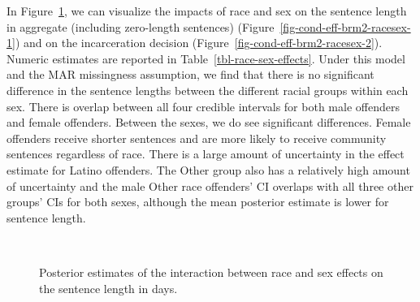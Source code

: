 \documentclass[
  letterpaper,
  DIV=11,
  numbers=noendperiod]{scrartcl}
\begin{document}
In Figure~\ref{fig-cond-eff-brm2-racesex}, we can visualize the impacts
of race and sex on the sentence length in aggregate (including
zero-length sentences) (Figure~\ref{fig-cond-eff-brm2-racesex-1}) and on
the incarceration decision (Figure~\ref{fig-cond-eff-brm2-racesex-2}).
Numeric estimates are reported in Table~\ref{tbl-race-sex-effects}.
Under this model and the MAR missingness assumption, we find that there
is no significant difference in the sentence lengths between the
different racial groups within each sex. There is overlap between all
four credible intervals for both male offenders and female offenders.
Between the sexes, we do see significant differences. Female offenders
receive shorter sentences and are more likely to receive community
sentences regardless of race. There is a large amount of uncertainty in
the effect estimate for Latino offenders. The Other group also has a
relatively high amount of uncertainty and the male Other race offenders'
CI overlaps with all three other groups' CIs for both sexes, although
the mean posterior estimate is lower for sentence length.

\begin{figure}

\begin{minipage}[t]{0.47\linewidth}

{\centering 


}

\end{minipage}%
%
\begin{minipage}[t]{0.06\linewidth}

{\centering 

~

}

\end{minipage}%
%
\begin{minipage}[t]{0.47\linewidth}

{\centering 


}

\end{minipage}%

\caption{\label{fig-cond-eff-brm2-racesex}Posterior estimates of the
interaction between race and sex effects on the sentence length in
days.}

\end{figure}
\end{document}
